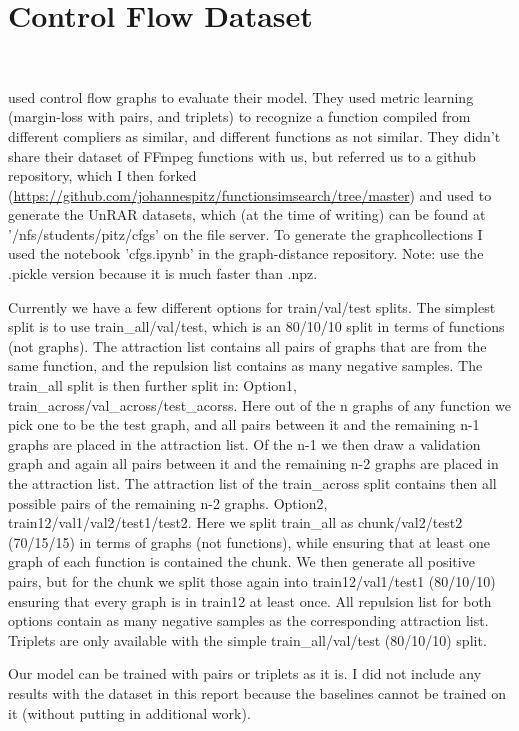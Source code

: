 \section{Control Flow Dataset}\

\cite{li2019} used control flow graphs to evaluate their model. They used metric learning (margin-loss with pairs, and triplets) to recognize a function compiled from different compliers as similar, and different functions as not similar. They didn't share their dataset of FFmpeg functions with us, but referred us to a github repository, which I then forked (\url{https://github.com/johannespitz/functionsimsearch/tree/master}) and used to generate the UnRAR datasets, which (at the time of writing) can be found at '/nfs/students/pitz/cfgs' on the file server. To generate the graphcollections I used the notebook 'cfgs.ipynb' in the graph-distance repository. Note: use the .pickle version because it is much faster than .npz.

Currently we have a few different options for train/val/test splits. The simplest split is to use train\_all/val/test, which is an 80/10/10 split in terms of functions (not graphs). The attraction list contains all pairs of graphs that are from the same function, and the repulsion list contains as many negative samples. The train\_all split is then further split in: Option1, train\_across/val\_across/test\_acorss. Here out of the n graphs of any function we pick one to be the test graph, and all pairs between it and the remaining n-1 graphs are placed in the attraction list. Of the n-1 we then draw a validation graph and again all pairs between it and the remaining n-2 graphs are placed in the attraction list. The attraction list of the train\_across split contains then all possible pairs of the remaining n-2 graphs. Option2, train12/val1/val2/test1/test2. Here we split train\_all as chunk/val2/test2 (70/15/15) in terms of graphs (not functions), while ensuring that at least one graph of each function is contained the chunk. We then generate all positive pairs, but for the chunk we split those again into train12/val1/test1 (80/10/10) ensuring that every graph is in train12 at least once. All repulsion list for both options contain as many negative samples as the corresponding attraction list. Triplets are only available with the simple  train\_all/val/test (80/10/10) split.

Our model can be trained with pairs or triplets as it is. I did not include any results with the dataset in this report because the baselines cannot be trained on it (without putting in additional work).

